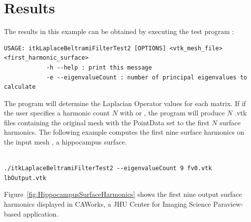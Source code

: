 \documentclass{InsightArticle}
\begin{document}
\section{Results}
The results in this example can be obtained by executing the test program
:

\small
\begin{verbatim}
USAGE: itkLaplaceBeltramiFilterTest2 [OPTIONS] <vtk_mesh_file> <first_harmonic_surface>
            -h --help : print this message
            -e --eigenvalueCount : number of principal eigenvalues to calculate

\end{verbatim}
\normalsize

The program will determine the Laplacian Operator values for each matrix.  If
if the user specifies a harmonic count $N$ with  or 
, the program will produce $N$ .vtk files containing
the original mesh with the PointData set to the first $N$ surface harmonics.
The following example computes the first nine surface harmonics on the input
mesh , a hippocampus surface.

\small
\begin{verbatim}

./itkLaplaceBeltramiFilterTest2 --eigenvalueCount 9 fv0.vtk lbOutput.vtk

\end{verbatim}
\normalsize

Figure~\ref{fig:HippocampusSurfaceHarmonics} shows the first nine output surface
harmonics displayed in CAWorks, a JHU Center for
Imaging Science Paraview-based application.
\end{document}
